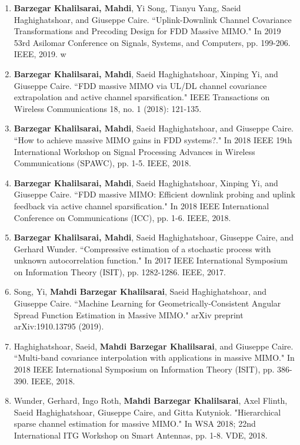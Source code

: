 \documentclass[a4paper,10pt]{article}
\begin{document}
\begin{enumerate}
	\item \textbf{Barzegar Khalilsarai, Mahdi}, Yi Song, Tianyu Yang, Saeid Haghighatshoar, and Giuseppe Caire. ``Uplink-Downlink Channel Covariance Transformations and Precoding Design for FDD Massive MIMO." In 2019 53rd Asilomar Conference on Signals, Systems, and Computers, pp. 199-206. IEEE, 2019.
	w	 	 	
	\item \textbf{Barzegar Khalilsarai, Mahdi}, Saeid Haghighatshoar, Xinping Yi, and Giuseppe Caire. ``FDD massive MIMO via UL/DL channel covariance extrapolation and active channel sparsification." IEEE Transactions on Wireless Communications 18, no. 1 (2018): 121-135.
	
	\item \textbf{Barzegar Khalilsarai, Mahdi}, Saeid Haghighatshoar, and Giuseppe Caire. ``How to achieve massive MIMO gains in FDD systems?." In 2018 IEEE 19th International Workshop on Signal Processing Advances in Wireless Communications (SPAWC), pp. 1-5. IEEE, 2018.
	
	\item \textbf{Barzegar Khalilsarai, Mahdi}, Saeid Haghighatshoar, Xinping Yi, and Giuseppe Caire. ``FDD massive MIMO: Efficient downlink probing and uplink feedback via active channel sparsification." In 2018 IEEE International Conference on Communications (ICC), pp. 1-6. IEEE, 2018.
	
	\item \textbf{Barzegar Khalilsarai, Mahdi}, Saeid Haghighatshoar, Giuseppe Caire, and Gerhard Wunder. ``Compressive estimation of a stochastic process with unknown autocorrelation function." In 2017 IEEE International Symposium on Information Theory (ISIT), pp. 1282-1286. IEEE, 2017.
	
	\item Song, Yi, \textbf{Mahdi Barzegar Khalilsarai}, Saeid Haghighatshoar, and Giuseppe Caire. ``Machine Learning for Geometrically-Consistent Angular Spread Function Estimation in Massive MIMO." arXiv preprint arXiv:1910.13795 (2019).
	
	\item Haghighatshoar, Saeid, \textbf{Mahdi Barzegar Khalilsarai}, and Giuseppe Caire. ``Multi-band covariance interpolation with applications in massive MIMO." In 2018 IEEE International Symposium on Information Theory (ISIT), pp. 386-390. IEEE, 2018.
	
	\item Wunder, Gerhard, Ingo Roth, \textbf{Mahdi Barzegar Khalilsarai}, Axel Flinth, Saeid Haghighatshoar, Giuseppe Caire, and Gitta Kutyniok. "Hierarchical sparse channel estimation for massive MIMO." In WSA 2018; 22nd International ITG Workshop on Smart Antennas, pp. 1-8. VDE, 2018.
	

\end{enumerate}
\end{document}

